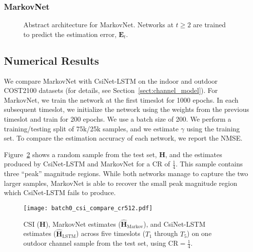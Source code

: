 \subsubsection*{MarkovNet}

\begin{figure}[!hbtp]
    \centering
    {
      \fontsize{6pt}{8pt}
      \def\svgwidth{0.8\columnwidth}
      
    }
    \caption{Abstract architecture for MarkovNet. Networks at $t \geq 2$ are trained to predict the estimation error, $\mathbf E_t$.}
    \label{fig:markovnet_schema}
\end{figure}

\subsection{Numerical Results}

We compare MarkovNet with CsiNet-LSTM \cite{ref:Wang2019CsiNetLSTM} on the indoor and outdoor COST2100 datasets (for details, see Section~\ref{sect:channel_model}). For MarkovNet, we train the network at the first timeslot for 1000 epochs. In each subsequent timeslot, we initialize the network using the weights from the previous timeslot and train for 200 epochs. We use a batch size of 200. We perform a training/testing split of 75k/25k samples, and we estimate $\gamma$ using the training set. To compare the estimation accuracy of each network, we report the NMSE.

Figure~\ref{fig:csi_image} shows a random sample from the test set, $\mathbf H$, and the estimates produced by CsiNet-LSTM and MarkovNet for a CR of $\frac 14$. This sample contains three ``peak'' magnitude regions. While both networks manage to capture the two larger samples, MarkovNet is able to recover the small peak magnitude region which CsiNet-LSTM fails to produce.

\begin{figure}[htb] \centering 
	\texttt{[image: batch0\_csi\_compare\_cr512.pdf]}
	\caption{CSI ($\mathbf H$), MarkovNet estimates ($\hat{\mathbf H}_{\text{Markov}}$), and CsiNet-LSTM estimates ($\hat{\mathbf H}_{\text{LSTM}}$) across five timeslots ($T_1$ through $T_5$) on one outdoor channel sample from the test set,
using $\text{CR}=\frac 14$.} 
	\label{fig:csi_image} 
\end{figure}